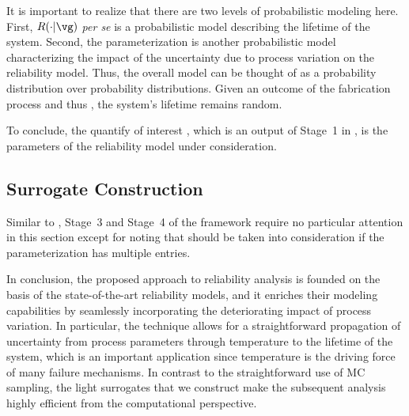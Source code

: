 \begin{remark} 
It is important to realize that there are two levels of probabilistic modeling
here. First, $R(\cdot | \vg)$ \emph{per se} is a probabilistic model describing
the lifetime \life of the system. Second, the parameterization \vg is another
probabilistic model characterizing the impact of the uncertainty due to process
variation on the reliability model. Thus, the overall model can be thought of as
a probability distribution over probability distributions. Given an outcome of
the fabrication process and thus \vg, the system's lifetime remains random.
\end{remark}

To conclude, the quantify of interest \g, which is an output of Stage~1 in
, is the parameters \vg of the reliability model under
consideration.

\subsection{Surrogate Construction}

Similar to , Stage~3 and Stage~4 of the
framework require no particular attention in this section except for noting that
 should be taken into consideration if the
parameterization \vg has multiple entries.

\conclusioncut
In conclusion, the proposed approach to reliability analysis is founded on the
basis of the state-of-the-art reliability models, and it enriches their modeling
capabilities by seamlessly incorporating the deteriorating impact of process
variation. In particular, the technique allows for a straightforward propagation
of uncertainty from process parameters through temperature to the lifetime of
the system, which is an important application since temperature is the driving
force of many failure mechanisms. In contrast to the straightforward use of
\ac{MC} sampling, the light surrogates that we construct make the subsequent
analysis highly efficient from the computational perspective.
